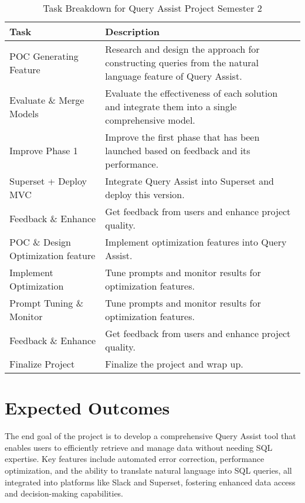     \begin{table}[!h]
        \centering
        \caption{Task Breakdown for Query Assist Project Semester 2}
        \label{tbl:task-breakdown-second-semester}
        \begin{tabular}{|p{4cm}|p{10cm}|}
            \hline
            \textbf{Task} & \textbf{Description} \\
            \hline
            POC Generating Feature & Research and design the approach for constructing queries from the natural language feature of Query Assist. \\
            \hline
            Evaluate \& Merge Models & Evaluate the effectiveness of each solution and integrate them into a single comprehensive model. \\
            \hline
            Improve Phase 1 & Improve the first phase that has been launched based on feedback and its performance. \\
            \hline
            Superset + Deploy MVC & Integrate Query Assist into Superset and deploy this version. \\
            \hline
            Feedback \& Enhance & Get feedback from users and enhance project quality. \\
            \hline
            POC \& Design Optimization feature & Implement optimization features into Query Assist. \\
            \hline
            Implement Optimization & Tune prompts and monitor results for optimization features. \\
            \hline
            Prompt Tuning \& Monitor & Tune prompts and monitor results for optimization features. \\
            \hline
            Feedback \& Enhance & Get feedback from users and enhance project quality. \\
            \hline
            Finalize Project & Finalize the project and wrap up. \\
            \hline
        \end{tabular}
    \end{table}
\pagebreak

\section{Expected Outcomes}
The end goal of the project is to develop a comprehensive Query Assist tool that enables users to efficiently retrieve and manage data without needing SQL expertise. Key features include automated error correction, performance optimization, and the ability to translate natural language into SQL queries, all integrated into platforms like Slack and Superset, fostering enhanced data access and decision-making capabilities.

